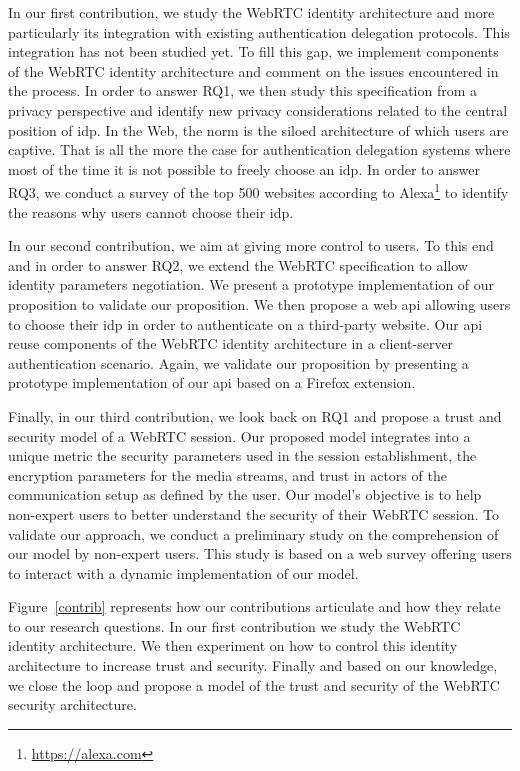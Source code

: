 In our first contribution, we study the WebRTC identity architecture and more particularly its integration with existing authentication delegation protocols.
This integration has not been studied yet. 
To fill this gap, we implement components of the WebRTC identity architecture and comment on the issues encountered in the process.
In order to answer RQ1, we then study this specification from a privacy perspective and identify new privacy considerations related to the central position of \gls{idp}.
In the Web, the norm is the siloed architecture of which users are captive.
That is all the more the case for authentication delegation systems where most of the time it is not possible to freely choose an \gls{idp}.
In order to answer RQ3, we conduct a survey of the top 500 websites according to Alexa\footnote{\url{https://alexa.com}} to identify the reasons why users cannot choose their \gls{idp}.

In our second contribution, we aim at giving more control to users.
To this end and in order to answer RQ2, we extend the WebRTC specification to allow identity parameters negotiation.
We present a prototype implementation of our proposition to validate our proposition.
We then propose a web \gls{api} allowing users to choose their \gls{idp} in order to authenticate on a third-party website.
Our \gls{api} reuse components of the WebRTC identity architecture in a client-server authentication scenario. 
Again, we validate our proposition by presenting a prototype implementation of our \gls{api} based on a Firefox extension.

Finally, in our third contribution, we look back on RQ1 and propose a trust and security model of a WebRTC session.
Our proposed model integrates into a unique metric the security parameters used in the session establishment, the encryption parameters for the media streams, and trust in actors of the communication setup as defined by the user.
Our model's objective is to help non-expert users to better understand the security of their WebRTC session.
To validate our approach, we conduct a preliminary study on the comprehension of our model by non-expert users.
This study is based on a web survey offering users to interact with a dynamic implementation of our model.

Figure~\ref{contrib} represents how our contributions articulate and how they relate to our research questions.
In our first contribution we study the WebRTC identity architecture.
We then experiment on how to control this identity architecture to increase trust and security.
Finally and based on our knowledge, we close the loop and propose a model of the trust and security of the WebRTC security architecture.
 
